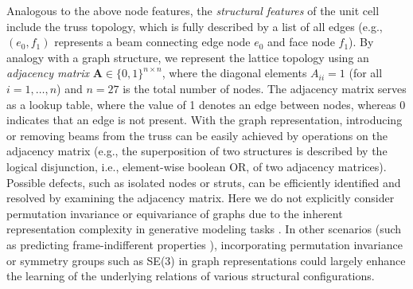 \documentclass[fleqn,10pt]{wlscirep}
\newcommand{\boldface}[1]{\boldsymbol{#1}}
\newcommand{\bfA}{\boldface{A}}
\begin{document}
Analogous to the above node features, the \textit{structural features} of the unit cell include the truss topology, which is fully described by a list of all edges (e.g., $(e_0, f_1)$ represents a beam connecting edge node $e_0$ and face node $f_1$).
By analogy with a graph structure, we represent the lattice topology using an \textit{adjacency matrix} $\bfA \in \{0,1\}^{n \times n}$, where the diagonal elements $A_{ii} = 1$ (for all $i=1,\dots,n$) and $n = 27$ is the total number of nodes. The adjacency matrix serves as a lookup table, where the value of 1 denotes an edge between nodes, whereas 0 indicates that an edge is not present. With the graph representation, introducing or removing beams from the truss can be easily achieved by operations on the adjacency matrix (e.g., the superposition of two structures is described by the logical disjunction, i.e., element-wise boolean OR, of two adjacency matrices). Possible defects, such as isolated nodes or struts, can be efficiently identified and resolved by examining the adjacency matrix. Here we do not explicitly consider permutation invariance or equivariance of graphs due to the inherent representation complexity in generative modeling tasks \cite{simonovsky2018graphvae, you2018graphrnn}. In other scenarios (such as predicting frame-indifferent properties \cite{vlassis2020geometric, vlassis2023geometric}), incorporating permutation invariance or symmetry groups such as SE(3) in graph representations \cite{thomas2018tensor, fuchs2020se, batzner20223, cai2023equivariant} could largely enhance the learning of the underlying relations of various structural configurations.
\end{document}
